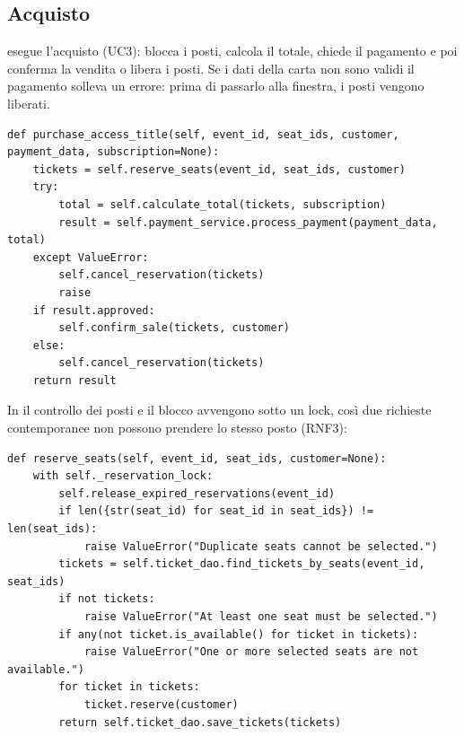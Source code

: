 \subsection{Acquisto}

 esegue l'acquisto (UC3): blocca i posti, calcola il totale, chiede il pagamento e poi conferma la vendita o libera i posti. Se i dati della carta non sono validi il pagamento solleva un errore: prima di passarlo alla finestra, i posti vengono liberati.

\par\noindent\begin{minipage}{\linewidth}
\begin{lstlisting}
def purchase_access_title(self, event_id, seat_ids, customer, payment_data, subscription=None):
    tickets = self.reserve_seats(event_id, seat_ids, customer)
    try:
        total = self.calculate_total(tickets, subscription)
        result = self.payment_service.process_payment(payment_data, total)
    except ValueError:
        self.cancel_reservation(tickets)
        raise
    if result.approved:
        self.confirm_sale(tickets, customer)
    else:
        self.cancel_reservation(tickets)
    return result
\end{lstlisting}
\end{minipage}\par

In  il controllo dei posti e il blocco avvengono sotto un lock, così due richieste contemporanee non possono prendere lo stesso posto (RNF3):

\par\noindent\begin{minipage}{\linewidth}
\begin{lstlisting}
def reserve_seats(self, event_id, seat_ids, customer=None):
    with self._reservation_lock:
        self.release_expired_reservations(event_id)
        if len({str(seat_id) for seat_id in seat_ids}) != len(seat_ids):
            raise ValueError("Duplicate seats cannot be selected.")
        tickets = self.ticket_dao.find_tickets_by_seats(event_id, seat_ids)
        if not tickets:
            raise ValueError("At least one seat must be selected.")
        if any(not ticket.is_available() for ticket in tickets):
            raise ValueError("One or more selected seats are not available.")
        for ticket in tickets:
            ticket.reserve(customer)
        return self.ticket_dao.save_tickets(tickets)
\end{lstlisting}
\end{minipage}\par

